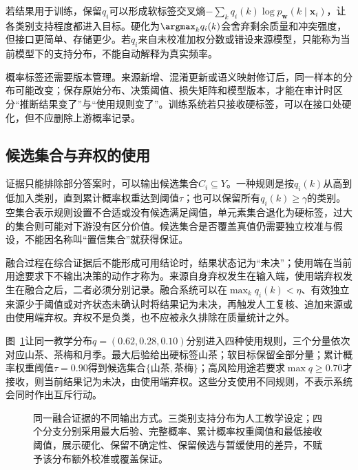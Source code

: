 若结果用于训练，保留$q_i$可以形成软标签交叉熵$-\sum_k q_i(k)\log p_{\bm{w}}(k\mid\bm{x}_i)$，让各类别支持程度都进入目标。硬化为$\argmax_k q_i(k)$会舍弃剩余质量和冲突强度，但接口更简单、存储更少。若$q_i$来自未校准加权分数或错设来源模型，只能称为当前模型下的支持分布，不能自动解释为真实频率。

概率标签还需要版本管理。来源新增、混淆更新或语义映射修订后，同一样本的分布可能改变；保存原始分布、决策阈值、损失矩阵和模型版本，才能在审计时区分“推断结果变了”与“使用规则变了”。训练系统若只接收硬标签，可以在接口处硬化，但不应删除上游概率记录。

\subsection{候选集合与弃权的使用}
\label{sec:knowledge-fusion-set-abstention-use}

证据只能排除部分答案时，可以输出候选集合$C_i\subseteq Y$。一种规则是按$q_i(k)$从高到低加入类别，直到累计概率权重达到阈值$\tau$；也可以保留所有$q_i(k)\geq\gamma$的类别。空集合表示规则设置不合适或没有候选满足阈值，单元素集合退化为硬标签，过大的集合则可能对下游没有区分价值。候选集合是否覆盖真值仍需要独立校准与假设，不能因名称叫“置信集合”就获得保证。

融合过程在综合证据后不能形成可用结论时，结果状态记为“未决”；使用端在当前用途要求下不输出决策的动作才称为。来源自身弃权发生在输入端，使用端弃权发生在融合之后，二者必须分别记录。融合系统可以在$\max_k q_i(k)<\eta$、有效独立来源少于阈值或对齐状态未确认时将结果记为未决，再触发人工复核、追加来源或由使用端弃权。弃权不是负类，也不应被永久排除在质量统计之外。

图~\ref{fig:knowledge-fusion-output-forms}让同一教学分布$q=(0.62,0.28,0.10)$分别进入四种使用规则，三个分量依次对应山茶、茶梅和月季。最大后验给出硬标签山茶；软目标保留全部分量；累计概率权重阈值$\tau=0.90$得到候选集合$\{\text{山茶},\text{茶梅}\}$；高风险用途若要求$\max q\geq0.70$才接收，则当前结果记为未决，由使用端弃权。这些分支使用不同规则，不表示系统会同时作出互斥行动。

\begin{figure}[htbp]
  \centering
  
  \caption{同一融合证据的不同输出方式。三类别支持分布为人工教学设定；四个分支分别采用最大后验、完整概率、累计概率权重阈值和最低接收阈值，展示硬化、保留不确定性、保留候选与暂缓使用的差异，不赋予该分布额外校准或覆盖保证。}
  \label{fig:knowledge-fusion-output-forms}
\end{figure}
\FloatBarrier

